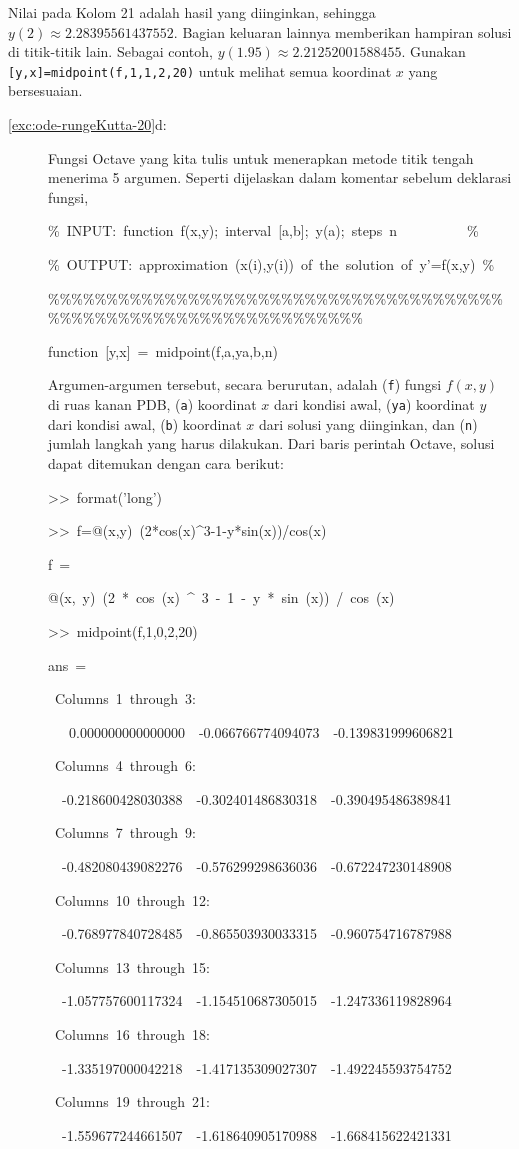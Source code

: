 Nilai pada Kolom 21 adalah hasil yang diinginkan, sehingga $y(2)\approx2.28395561437552$.
Bagian keluaran lainnya memberikan hampiran solusi di titik-titik
lain. Sebagai contoh, $y(1.95)\approx2.21252001588455$. Gunakan \texttt{{[}y,x{]}=midpoint(f,1,1,2,20)}
untuk melihat semua koordinat $x$ yang bersesuaian.
\begin{description}
\item [{\ref{exc:ode-rungeKutta-20}d:}] Fungsi Octave yang kita tulis
untuk menerapkan metode titik tengah menerima 5 argumen. Seperti dijelaskan
dalam komentar sebelum deklarasi fungsi,

\begin{lyxcode}
\%~INPUT:~function~f(x,y);~interval~{[}a,b{]};~y(a);~steps~n~~~~~~~~~~\%

\%~OUTPUT:~approximation~(x(i),y(i))~of~the~solution~of~y'=f(x,y)~\%

\%\%\%\%\%\%\%\%\%\%\%\%\%\%\%\%\%\%\%\%\%\%\%\%\%\%\%\%\%\%\%\%\%\%\%\%\%\%\%\%\%\%\%\%\%\%\%\%\%\%\%\%\%\%\%\%\%\%\%\%\%\%\%\%\%\%

function~{[}y,x{]}~=~midpoint(f,a,ya,b,n)~
\end{lyxcode}
Argumen-argumen tersebut, secara berurutan, adalah (\texttt{f}) fungsi
$f(x,y)$ di ruas kanan PDB, (\texttt{a}) koordinat $x$ dari kondisi
awal, (\texttt{ya}) koordinat $y$ dari kondisi awal, (\texttt{b})
koordinat $x$ dari solusi yang diinginkan, dan (\texttt{n}) jumlah
langkah yang harus dilakukan. Dari baris perintah Octave, solusi dapat
ditemukan dengan cara berikut:
\begin{lyxcode}
>\textcompwordmark >~format('long')

>\textcompwordmark >~f=@(x,y)~(2{*}cos(x)\textasciicircum 3-1-y{*}sin(x))/cos(x)

f~=

@(x,~y)~(2~{*}~cos~(x)~\textasciicircum ~3~-~1~-~y~{*}~sin~(x))~/~cos~(x)

>\textcompwordmark >~midpoint(f,1,0,2,20)

ans~=

~Columns~1~through~3:

~~~0.000000000000000~~-0.066766774094073~~-0.139831999606821

~Columns~4~through~6:

~~-0.218600428030388~~-0.302401486830318~~-0.390495486389841

~Columns~7~through~9:

~~-0.482080439082276~~-0.576299298636036~~-0.672247230148908

~Columns~10~through~12:

~~-0.768977840728485~~-0.865503930033315~~-0.960754716787988

~Columns~13~through~15:

~~-1.057757600117324~~-1.154510687305015~~-1.247336119828964

~Columns~16~through~18:

~~-1.335197000042218~~-1.417135309027307~~-1.492245593754752

~Columns~19~through~21:

~~-1.559677244661507~~-1.618640905170988~~-1.668415622421331
\end{lyxcode}
\end{description}
